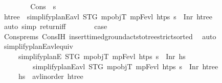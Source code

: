 \begin{isabellebody}
\ \ \isamarkupfalse%
\isanewline
\ \ \ \ \isamarkupfalse%
\ {\isacharparenleft}{\kern0pt}Cons\ {\isasympi}\ {\isasympi}s{\isacharparenright}{\kern0pt}\isanewline
\ \ \ \ \isamarkupfalse%
\ \isamarkupfalse%
\ htree{\isacharprime}{\kern0pt}\ \ {\isachardoublequoteopen}simplify{\isacharunderscore}{\kern0pt}planE{\isacharunderscore}{\kern0pt}avl{\isacharprime}{\kern0pt}\ STG\ mp{\isacharunderscore}{\kern0pt}objT\ mp{\isacharunderscore}{\kern0pt}Fevl\ htps\ {\isasympi}s\ {\isacharequal}{\kern0pt}\ Inr\ htree{\isacharprime}{\kern0pt}{\isachardoublequoteclose}\isanewline
\ \ \ \ \ \ \isamarkupfalse%
\ {\isacharparenleft}{\kern0pt}auto\ simp{\isacharcolon}{\kern0pt}\ return{\isacharunderscore}{\kern0pt}iff{\isacharparenright}{\kern0pt}\isanewline
\ \ \ \ \isamarkupfalse%
\ \isamarkupfalse%
\ {\isacharquery}{\kern0pt}case\ \isanewline
\ \ \ \ \ \ \isamarkupfalse%
\ Cons{\isachardot}{\kern0pt}prems\ Cons{\isachardot}{\kern0pt}IH\ insert{\isacharunderscore}{\kern0pt}timed{\isacharunderscore}{\kern0pt}ground{\isacharunderscore}{\kern0pt}acts{\isacharunderscore}{\kern0pt}to{\isacharunderscore}{\kern0pt}tree{\isacharunderscore}{\kern0pt}strict{\isacharunderscore}{\kern0pt}sorted\ \isamarkupfalse%
\ auto\isanewline
\ \ \isamarkupfalse%
%
\endisatagproof
{\isafoldproof}%
%
\isadelimproof
\isanewline
%
\endisadelimproof
\isanewline
\ \ \isamarkupfalse%
\ simplify{\isacharunderscore}{\kern0pt}planE{\isacharunderscore}{\kern0pt}avl{\isacharprime}{\kern0pt}{\isacharunderscore}{\kern0pt}equiv{\isacharcolon}{\kern0pt}\ \isanewline
\ \ \ \ \ {\isachardoublequoteopen}simplify{\isacharunderscore}{\kern0pt}planE\ STG\ mp{\isacharunderscore}{\kern0pt}objT\ mp{\isacharunderscore}{\kern0pt}Fevl\ htps\ {\isasympi}s\ {\isacharequal}{\kern0pt}\ Inr\ hs{\isachardoublequoteclose}\ \isanewline
\ \ \ \ \ \ \ \ \ {\isachardoublequoteopen}simplify{\isacharunderscore}{\kern0pt}planE{\isacharunderscore}{\kern0pt}avl{\isacharprime}{\kern0pt}\ STG\ mp{\isacharunderscore}{\kern0pt}objT\ mp{\isacharunderscore}{\kern0pt}Fevl\ htps\ {\isasympi}s\ {\isacharequal}{\kern0pt}\ Inr\ htree{\isachardoublequoteclose}\ \isanewline
\ \ \ \ \ {\isachardoublequoteopen}hs\ {\isacharequal}{\kern0pt}\ avl{\isacharunderscore}{\kern0pt}inorder\ htree{\isachardoublequoteclose}\isanewline
%
\isadelimproof
\ \ \ \ %

\end{isabellebody}
